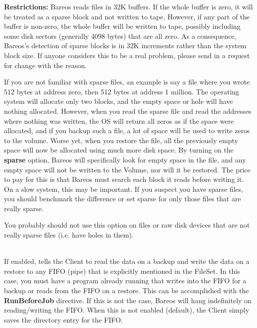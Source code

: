\begin{description}
   {\bf Restrictions:} Bareos reads files in 32K buffers.  If the whole
   buffer is zero, it will be treated as a sparse block and not written to
   tape.  However, if any part of the buffer is non-zero, the whole buffer
   will be written to tape, possibly including some disk sectors (generally
   4098 bytes) that are all zero.  As a consequence, Bareos's detection of
   sparse blocks is in 32K increments rather than the system block size.
   If anyone considers this to be a real problem, please send in a request
   for change with the reason.

   If you are not familiar with sparse files, an example is say a file
   where you wrote 512 bytes at address zero, then 512 bytes at address 1
   million.  The operating system will allocate only two blocks, and the
   empty space or hole will have nothing allocated.  However, when you read
   the sparse file and read the addresses where nothing was written, the OS
   will return all zeros as if the space were allocated, and if you backup
   such a file, a lot of space will be used to write zeros to the volume.
   Worse yet, when you restore the file, all the previously empty space
   will now be allocated using much more disk space.  By turning on the
   {\bf sparse} option, Bareos will specifically look for empty space in
   the file, and any empty space will not be written to the Volume, nor
   will it be restored.  The price to pay for this is that Bareos must
   search each block it reads before writing it.  On a slow system, this
   may be important.  If you suspect you have sparse files, you should
   benchmark the difference or set sparse for only those files that are
   really sparse.

   You probably should not use this option on files or raw disk devices
   that are not really sparse files (i.e. have holes in them).

\item [readfifo=yes{\textbar}no] \hfill \\
\label{readfifo}
   If enabled, tells the Client to read the data on a backup and write the
   data on a restore to any FIFO (pipe) that is explicitly mentioned in the
   FileSet.  In this case, you must have a program already running that
   writes into the FIFO for a backup or reads from the FIFO on a restore.
   This can be accomplished with the {\bf RunBeforeJob} directive.  If this
   is not the case, Bareos will hang indefinitely on reading/writing the
   FIFO. When this is not enabled (default), the Client simply saves the
   directory entry for the FIFO.


\end{description}
